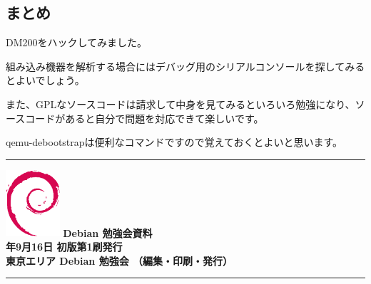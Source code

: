 \documentclass[mingoth,a4paper]{jsarticle}
\newcommand{\debmtgyear}{2017}
\newcommand{\debmtgmonth}{9}
\newcommand{\debmtgdate}{16}
\begin{document}
\subsection{まとめ}

DM200をハックしてみました。

組み込み機器を解析する場合にはデバッグ用のシリアルコンソールを探してみるとよいでしょう。

また、GPLなソースコードは請求して中身を見てみるといろいろ勉強になり、ソースコードがあると自分で問題を対応できて楽しいです。

qemu-debootstrapは便利なコマンドですので覚えておくとよいと思います。


%
\mbox{}\newpage


\vspace*{15cm}
\hrule
\vspace{2mm}
\includegraphics[width=2cm]{image200502/openlogo-nd.eps}
\noindent \Large \bf Debian 勉強会資料\\
\noindent \normalfont \debmtgyear{}年\debmtgmonth{}月\debmtgdate{}日 \hspace{5mm}  初版第1刷発行\\
\noindent \normalfont 東京エリア Debian 勉強会 （編集・印刷・発行）\\
\hrule
\end{document}
